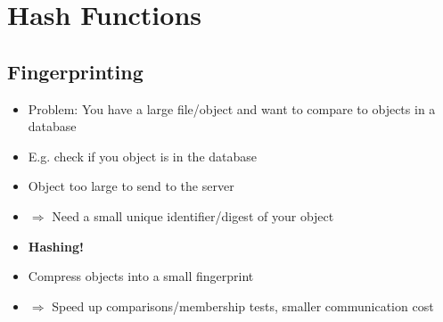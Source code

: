

\chapter{Hash Functions}

\section{Fingerprinting}
	\begin{itemize}
	    \item Problem: You have a large file/object and want to compare to objects in a database
	    \item E.g. check if you object is in the database
	    \item Object too large to send to the server
	    \item $\Rightarrow$ Need a small unique identifier/digest of your object
	    \item \textbf{Hashing!}
	    \item Compress objects into a small fingerprint
	    \item $\Rightarrow$ Speed up comparisons/membership tests, smaller communication cost
	\end{itemize}


